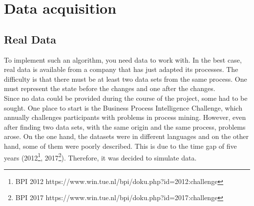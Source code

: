 \chapter{Data acquisition}

    \section{Real Data}
    To implement such an algorithm, you need data to work with. In the best case, real data is available from a company that has just adapted its processes. The difficulty is that there must be at least two data sets from the same process. One must represent the state before the changes and one after the changes.\\
    Since no data could be provided during the course of the project, some had to be sought. One place to start is the Business Process Intelligence Challenge, which annually challenges participants with problems in process mining. However, even after finding two data sets, with the same origin and the same process, problems arose. On the one hand, the datasets were in different languages and on the other hand, some of them were poorly described. This is due to the time gap of five years (2012\footnote{BPI 2012 https://www.win.tue.nl/bpi/doku.php?id=2012:challenge}, 2017\footnote{BPI 2017 https://www.win.tue.nl/bpi/doku.php?id=2017:challenge}). Therefore, it was decided to simulate data.

